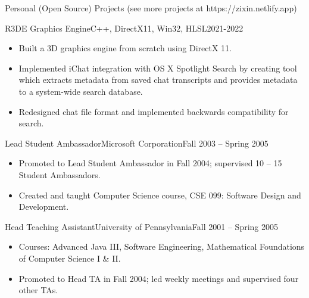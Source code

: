 \documentclass[]{mcdowellcv}
\begin{document}
	\begin{cvsection}{Personal (Open Source) Projects (see more projects at https://zixin.netlify.app)}
		\begin{cvsubsection}{R3DE Graphics Engine}{C++, DirectX11, Win32, HLSL}{2021-2022}			
			\begin{itemize}
				\item Built a 3D graphics engine from scratch using DirectX 11.
				\item Implemented iChat integration with OS X Spotlight Search by creating tool which extracts metadata from saved chat transcripts and provides metadata to a system-wide search database.
				\item Redesigned chat file format and implemented backwards compatibility for search.
			\end{itemize}
		\end{cvsubsection}
		
		\begin{cvsubsection}{Lead Student Ambassador}{Microsoft Corporation}{Fall 2003 -- Spring 2005}	
			\begin{itemize}
				\item Promoted to Lead Student Ambassador in Fall 2004; supervised 10 -- 15 Student Ambassadors.
				\item Created and taught Computer Science course, CSE 099: Software Design and Development.
			\end{itemize}
		\end{cvsubsection}
		
		\begin{cvsubsection}{Head Teaching Assistant}{University of Pennsylvania}{Fall 2001 -- Spring 2005}		
			\begin{itemize}
				\item Courses: Advanced Java III, Software Engineering, Mathematical Foundations of Computer Science I \& II.
				\item Promoted to Head TA in Fall 2004; led weekly meetings and supervised four other TAs.
			\end{itemize}
		\end{cvsubsection}
	\end{cvsection}
	
\end{document}
